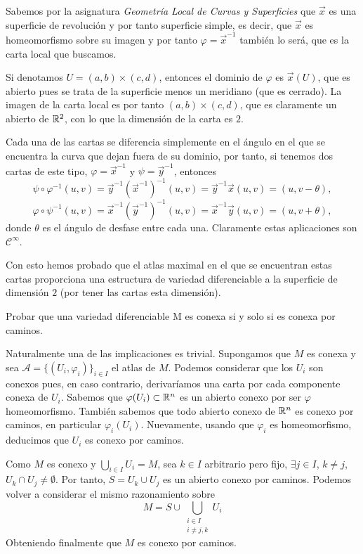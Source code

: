 \documentclass[twoside]{article}
\renewcommand{\A}{{\mathcal{A}}}
\begin{document}
\begin{solucion}
Sabemos por la asignatura \emph{ Geometría Local de Curvas y Superficies} que $\vec{x}$ es una superficie de revolución y por tanto superficie simple, es decir, que $\vec{x}$ es homeomorfismo sobre su imagen y por tanto $\varphi=\vec{x}^{-1}$ también lo será, que es la carta local que buscamos. 

Si denotamos $U=(a,b)\times(c,d)$, entonces el dominio de $\varphi$ es $\vec{x}(U)$, que es abierto pues se trata de la superficie menos un meridiano (que es cerrado). La imagen de la carta local es por tanto $(a,b)\times(c,d)$, que es claramente un abierto de $\mathbb{R}^2$, con lo que la dimensión de la carta es $2$. 


Cada una de las cartas se diferencia simplemente en el ángulo en el que se encuentra la curva que dejan fuera de su dominio, por tanto, si tenemos dos cartas de este tipo, $\varphi=\vec{x}^{-1}$ y $\psi=\vec{y}^{-1}$, entonces
$$\psi\circ\varphi^{-1}(u,v)=\vec{y}^{-1}(\vec{x}^{-1})^{-1}(u,v)=\vec{y}^{-1}\vec{x}(u,v)=(u,v-\theta),$$
$$\varphi\circ\psi^{-1}(u,v)=\vec{x}^{-1}(\vec{y}^{-1})^{-1}(u,v)=\vec{x}^{-1}\vec{y}(u,v)=(u,v+\theta),$$   
donde $\theta$ es el ángulo de desfase entre cada una. Claramente estas aplicaciones son $\mathcal{C}^\infty$. 

Con esto hemos probado que el atlas maximal en el que se encuentran estas cartas proporciona una estructura de variedad diferenciable a la superficie de dimensión $2$ (por tener las cartas esta dimensión).


\end{solucion}
\newpage

\begin{ejercicio}{8}\label{1}
Probar que una variedad diferenciable M es conexa si y solo si es conexa por caminos.
\end{ejercicio}
\begin{solucion}
Naturalmente una de las implicaciones es trivial. Supongamos que $M$ es conexa y sea $\A = \{(U_i,\varphi_i)\}_{i\in I}$ el atlas de $M$. Podemos considerar que los $U_i$ son conexos pues, en caso contrario, derivaríamos una carta por cada componente conexa de $U_i$. Sabemos que $\varphi(U_i)\subset \mathbb{R}^n$ es un abierto conexo por ser $\varphi$ homeomorfismo. También sabemos que todo abierto conexo de $\mathbb{R}^n$ es conexo por caminos, en particular $\varphi_i(U_i)$. Nuevamente, usando que $\varphi_i$ es homeomorfismo, deducimos que $U_i$ es conexo por caminos.

Como $M$ es conexo y $\bigcup_{i\in I} U_i = M$, sea $k\in I$ arbitrario pero fijo, $\exists j \in I$, $k\neq j$, $U_k \cap U_j \neq \emptyset$. Por tanto, $S = U_k \cup U_j$ es un abierto conexo por caminos. Podemos volver a considerar el mismo razonamiento sobre
$$ M = S\cup \bigcup_{\substack{i\in I\\ i\neq j,k}} U_i$$
Obteniendo finalmente que $M$ es conexo por caminos.
\end{solucion}
\end{document}
